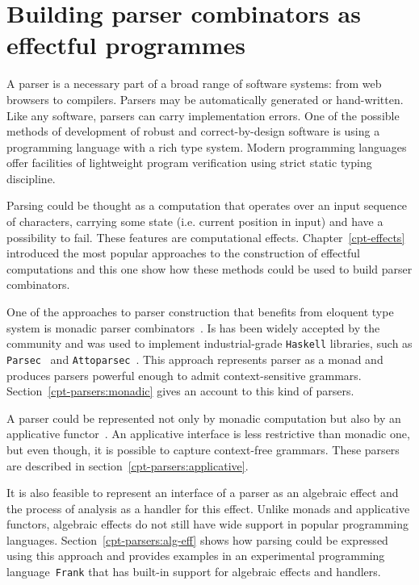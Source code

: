 \chapter{Building parser combinators as effectful programmes}
\label{cpt-parsers}

A parser is a necessary part of a broad range of software systems: from web browsers
to compilers. Parsers may be automatically generated or hand-written. Like any
software, parsers can carry implementation errors. One of the possible
methods of development of robust and correct-by-design software is using a programming
language with a rich type system. Modern programming languages offer facilities of
lightweight program verification using strict static typing discipline.

Parsing could be thought as a computation that operates over an input sequence of
characters, carrying some state (i.e. current position in input) and have a
possibility to fail. These features are computational effects. Chapter~\ref{cpt-effects}
introduced the most popular approaches to the construction of effectful computations and
this one show how these methods could be used to build parser combinators.

One of the approaches to parser construction that benefits from eloquent type system
is monadic parser combinators~\cite{monParsing}. Is has been widely accepted by the
community and was used to implement industrial-grade \texttt{Haskell} libraries, such
as \texttt{Parsec}~\cite{parsec} and \texttt{Attoparsec}~\cite{attoparsec}. This
approach represents parser as a monad and produces parsers powerful enough to admit
context-sensitive grammars. Section~\ref{cpt-parsers:monadic} gives an account to this kind of parsers.

A parser could be represented not only by monadic computation but also by an
applicative functor~\cite{Mcbride:2008:APE:1348940.1348941}. An applicative interface
is less restrictive than monadic one, but even though, it is possible to capture
context-free grammars. These parsers are described in
section~\ref{cpt-parsers:applicative}.

It is also feasible to represent an interface of a parser as an algebraic effect and
the process of analysis as a handler for this effect. Unlike monads and applicative functors,
algebraic effects do not still have wide support in popular programming languages.
Section~\ref{cpt-parsers:alg-eff} shows how parsing could be expressed using this
approach and provides examples in an experimental programming language~\texttt{Frank}
that has built-in support for algebraic effects and handlers.

